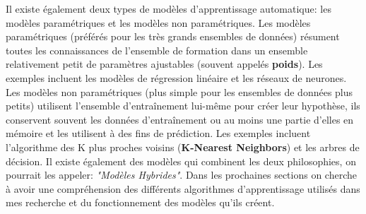 Il existe également deux types de modèles d'apprentissage automatique: les modèles paramétriques et les modèles non paramétriques. Les modèles paramétriques (préférés pour les très grands ensembles de données) résument toutes les connaissances de l'ensemble de formation dans un ensemble relativement petit de paramètres ajustables (souvent appelés \textbf{poids}). Les exemples incluent les modèles de régression linéaire et les réseaux de neurones.
Les modèles non paramétriques (plus simple pour les ensembles de données plus petits) utilisent l'ensemble d'entraînement lui-même pour créer leur hypothèse, ils conservent souvent les données d'entraînement ou au moins une partie d'elles en mémoire et les utilisent à des fins de prédiction. Les exemples incluent l'algorithme des K plus proches voisins (\textbf{K-Nearest Neighbors}) et les arbres de décision. Il existe également des modèles qui combinent les deux philosophies, on pourrait les appeler: \textit{"Modèles Hybrides"}. Dans les prochaines sections on cherche à avoir une compréhension des différents algorithmes d'apprentissage utilisés dans mes recherche et du fonctionnement des modèles qu'ils créent.
\clearpage